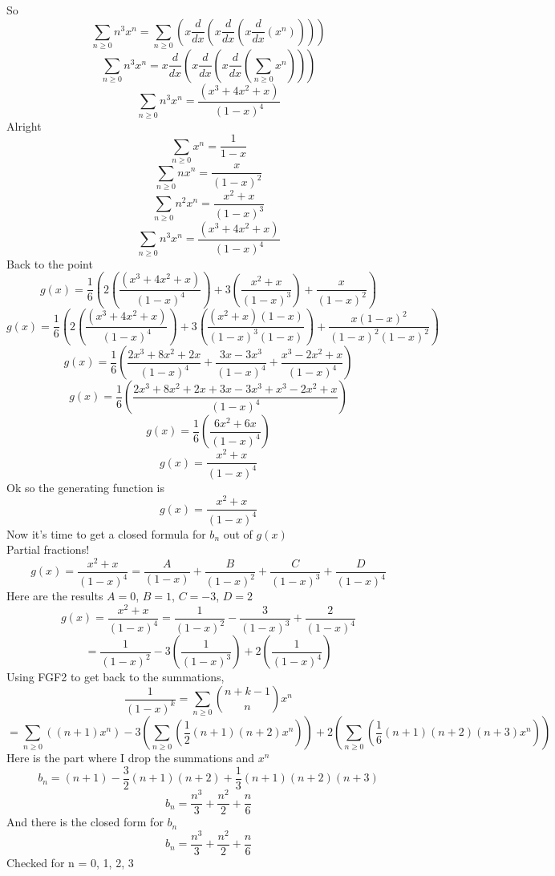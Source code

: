 \documentclass[10pt, AMS Euler]{article}
\begin{document}
        So
        $$ \sum_{n\geq0} n^3 x^n = \sum_{n\geq0} ( x \frac{d}{dx} (x \frac{d}{dx} (x \frac{d}{dx} (x^n)) ) ) $$
        $$ \sum_{n\geq0} n^3 x^n = x \frac{d}{dx} (x \frac{d}{dx} (x \frac{d}{dx} ( \sum_{n\geq0} x^n)) ) $$
	$$ \sum_{n\geq0} n^3 x^n = \frac{(x^3+4x^2+x)}{(1-x)^4} $$
	Alright
        $$ \sum_{n \geq 0} x^n = \frac{1}{1-x} $$
        $$ \sum_{n \geq 0} n x^n = \frac{x}{(1-x)^2} $$
        $$ \sum_{n \geq 0} n^2 x^n = \frac{x^2 + x}{(1-x)^3} $$ 
        $$ \sum_{n\geq0} n^3 x^n = \frac{(x^3+4x^2+x)}{(1-x)^4} $$
        Back to the point
        $$ g(x) = \frac{1}{6} ( 2 (\frac{(x^3+4x^2+x)}{(1-x)^4} ) + 3 ( \frac{x^2 + x}{(1-x)^3} ) + \frac{x}{(1-x)^2} ) $$
        $$ g(x) = \frac{1}{6} ( 2 (\frac{(x^3+4x^2+x)}{(1-x)^4} ) + 3 ( \frac{(x^2 + x)(1-x)}{(1-x)^3(1-x)} ) + \frac{x(1-x)^2}{(1-x)^2(1-x)^2} ) $$
        $$ g(x) = \frac{1}{6} ( \frac{2x^3+8x^2+2x}{(1-x)^4} + \frac{3x-3x^3}{(1-x)^4} + \frac{x^3 - 2x^2 + x}{(1-x)^4} ) $$
        $$ g(x) = \frac{1}{6} ( \frac{2x^3+8x^2+2x + 3x-3x^3 + x^3-2x^2+x}{(1-x)^4} ) $$
        $$ g(x) = \frac{1}{6} ( \frac{ 6x^2 + 6x }{(1-x)^4} ) $$
        $$ g(x) = \frac{ x^2 + x }{(1-x)^4} $$
        Ok so the generating function is
        $$ g(x) = \frac{ x^2 + x }{(1-x)^4} $$
        Now it's time to get a closed formula for $b_n$ out of $g(x)$ \\
        Partial fractions!
        $$ g(x) = \frac{ x^2 + x }{(1-x)^4} = \frac{A}{(1-x)} + \frac{B}{(1-x)^2} + \frac{C}{(1-x)^3} + \frac{D}{(1-x)^4} $$
        Here are the results $A=0$, $B=1$, $C=-3$, $D=2$
        $$ g(x) = \frac{ x^2 + x }{(1-x)^4} = \frac{1}{(1-x)^2} - \frac{3}{(1-x)^3} + \frac{2}{(1-x)^4} $$
        $$ = \frac{1}{(1-x)^2} -3 (\frac{1}{(1-x)^3}) + 2 (\frac{1}{(1-x)^4}) $$
        Using FGF2 to get back to the summations,
        $$ \frac{1}{(1-x)^k} = \sum_{n\geq0} \binom{n+k-1}{n} x^n $$
        $$ = \sum_{n\geq0}((n+1)x^n) -3 (\sum_{n\geq0}(\frac{1}{2}(n+1)(n+2)x^n)) + 2 (\sum_{n\geq0}(\frac{1}{6}(n+1)(n+2)(n+3)x^n)) $$
        Here is the part where I drop the summations and $x^n$
        $$ b_n = (n+1) - \frac{3}{2}(n+1)(n+2) + \frac{1}{3}(n+1)(n+2)(n+3) $$
        $$ b_n = \frac{n^3}{3} + \frac{n^2}{2} + \frac{n}{6} $$
        And there is the closed form for $b_n$
        $$ b_n = \frac{n^3}{3} + \frac{n^2}{2} + \frac{n}{6} $$
        Checked for n = 0, 1, 2, 3
        
        
 
	\noindent \underline{\hspace{3in}}\\
	
	
	
	
\end{document}
